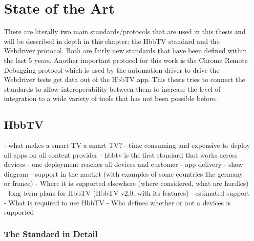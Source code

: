 %
%

\chapter{State of the Art\label{cha:state_of_the_art}}

There are literally two main standards/protocols that are used in this thesis and will be described in
depth in this chapter: the HbbTV standard and the Webdriver protocol. Both are fairly new standards that
have been defined within the last 5 years. Another important protocol for this work is the Chrome Remote
Debugging protocol which is used by the automation driver to drive the Webdriver tests get data out of
the HbbTV app. This thesis tries to connect the standards to allow interoperability between them to
increase the level of integration to a wide variety of tools that has not been possible before.

\section{HbbTV\label{sec:hbbtv}}


- what makes a smart TV a smart TV?
- time consuming and expensive to deploy all apps on all content provider
- hbbtv is the first standard that works across devices
- one deployment reaches all devices and customer
- app delivery
- show diagram
- support in the market (with examples of some countries like germany or france)
- Where it is supported elsewhere (where considered, what are hurdles)
- long term plans for HbbTV (HbbTV v2.0, with its features)
- estimated support
- What is required to use HbbTV
- Who defines whether or not a devices is supported

\subsection{The Standard in Detail\label{sec:hbbtvstandard}}

